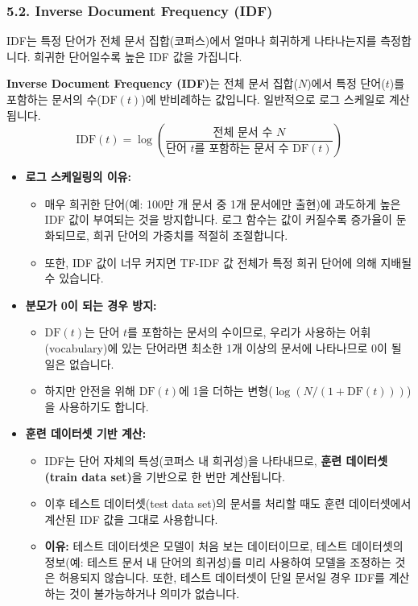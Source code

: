 \documentclass[11pt,a4paper]{article}
\theoremstyle{definition}
\begin{document}
\subsubsection{5.2. Inverse Document Frequency (IDF)}
IDF는 특정 단어가 전체 문서 집합(코퍼스)에서 얼마나 희귀하게 나타나는지를 측정합니다. 희귀한 단어일수록 높은 IDF 값을 가집니다.

\begin{tcolorbox}[definitionbox, title=Inverse Document Frequency (IDF) 정의]
\textbf{Inverse Document Frequency (IDF)}는 전체 문서 집합($N$)에서 특정 단어($t$)를 포함하는 문서의 수($\text{DF}(t)$)에 반비례하는 값입니다. 일반적으로 로그 스케일로 계산됩니다.
$$ \text{IDF}(t) = \log \left( \frac{\text{전체 문서 수 } N}{\text{단어 } t \text{를 포함하는 문서 수 } \text{DF}(t)} \right) $$
\end{tcolorbox}

\begin{itemize}
    \item \textbf{로그 스케일링의 이유:}
    \begin{itemize}
        \item 매우 희귀한 단어(예: 100만 개 문서 중 1개 문서에만 출현)에 과도하게 높은 IDF 값이 부여되는 것을 방지합니다. 로그 함수는 값이 커질수록 증가율이 둔화되므로, 희귀 단어의 가중치를 적절히 조절합니다.
        \item 또한, IDF 값이 너무 커지면 TF-IDF 값 전체가 특정 희귀 단어에 의해 지배될 수 있습니다.
    \end{itemize}
    \item \textbf{분모가 0이 되는 경우 방지:}
    \begin{itemize}
        \item $\text{DF}(t)$는 단어 $t$를 포함하는 문서의 수이므로, 우리가 사용하는 어휘(vocabulary)에 있는 단어라면 최소한 1개 이상의 문서에 나타나므로 0이 될 일은 없습니다.
        \item 하지만 안전을 위해 $\text{DF}(t)$에 1을 더하는 변형($\log(N / (1 + \text{DF}(t)))$)을 사용하기도 합니다.
    \end{itemize}
    \item \textbf{훈련 데이터셋 기반 계산:}
    \begin{itemize}
        \item IDF는 단어 자체의 특성(코퍼스 내 희귀성)을 나타내므로, \textbf{훈련 데이터셋(train data set)}을 기반으로 한 번만 계산됩니다.
        \item 이후 테스트 데이터셋(test data set)의 문서를 처리할 때도 훈련 데이터셋에서 계산된 IDF 값을 그대로 사용합니다.
        \item \textbf{이유:} 테스트 데이터셋은 모델이 처음 보는 데이터이므로, 테스트 데이터셋의 정보(예: 테스트 문서 내 단어의 희귀성)를 미리 사용하여 모델을 조정하는 것은 허용되지 않습니다. 또한, 테스트 데이터셋이 단일 문서일 경우 IDF를 계산하는 것이 불가능하거나 의미가 없습니다.
    \end{itemize}
\end{itemize}
\end{document}
